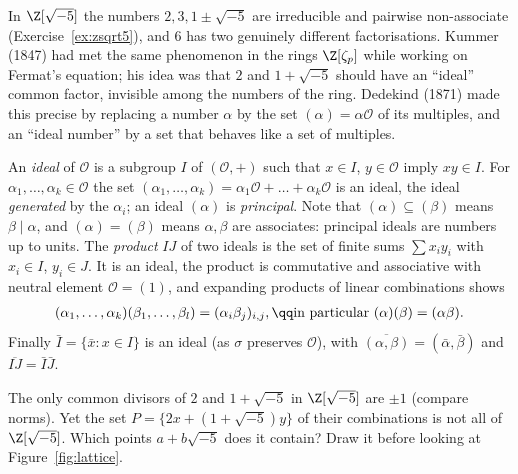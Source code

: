 In $\Z[\sqrt{-5}]$ the numbers $2,3,1\pm\sqrt{-5}$ are irreducible and pairwise non-associate (Exercise~\ref{ex:zsqrt5}), and $6$ has two genuinely different factorisations. Kummer (1847) had met the same phenomenon in the rings $\Z[\zeta_p]$ while working on Fermat's equation; his idea was that $2$ and $1+\sqrt{-5}$ should have an ``ideal'' common factor, invisible among the numbers of the ring. Dedekind (1871) made this precise by replacing a number $\alpha$ by the set $(\alpha)=\alpha\mathcal O$ of its multiples, and an ``ideal number'' by a set that behaves like a set of multiples.

An \emph{ideal} of $\mathcal O$ is a subgroup $I$ of $(\mathcal O,+)$ such that $x\in I$, $y\in\mathcal O$ imply $xy\in I$. For $\alpha_1,\dots,\alpha_k\in\mathcal O$ the set $(\alpha_1,\dots,\alpha_k)=\alpha_1\mathcal O+\dots+\alpha_k\mathcal O$ is an ideal, the ideal \emph{generated} by the $\alpha_i$; an ideal $(\alpha)$ is \emph{principal}. Note that $(\alpha)\subseteq(\beta)$ means $\beta\mid\alpha$, and $(\alpha)=(\beta)$ means $\alpha,\beta$ are associates: principal ideals are numbers up to units. The \emph{product} $IJ$ of two ideals is the set of finite sums $\sum x_iy_i$ with $x_i\in I$, $y_i\in J$. It is an ideal, the product is commutative and associative with neutral element $\mathcal O=(1)$, and expanding products of linear combinations shows
\[
\begin{gathered}(\alpha_1,\dots,\alpha_k)(\beta_1,\dots,\beta_l)=(\alpha_i\beta_j)_{i,j},\qq\text{in particular }(\alpha)(\beta)=(\alpha\beta).\end{gathered}
\]
Finally $\bar I=\{\bar x:x\in I\}$ is an ideal (as $\sigma$ preserves $\mathcal O$), with $\overline{(\alpha,\beta)}=(\bar\alpha,\bar\beta)$ and $\overline{IJ}=\bar I\bar J$.

\begin{think}
The only common divisors of $2$ and $1+\sqrt{-5}$ in $\Z[\sqrt{-5}]$ are $\pm1$ (compare norms). Yet the set $P=\{2x+(1+\sqrt{-5})y\}$ of their combinations is not all of $\Z[\sqrt{-5}]$. Which points $a+b\sqrt{-5}$ does it contain? Draw it before looking at Figure~\ref{fig:lattice}.
\end{think}

